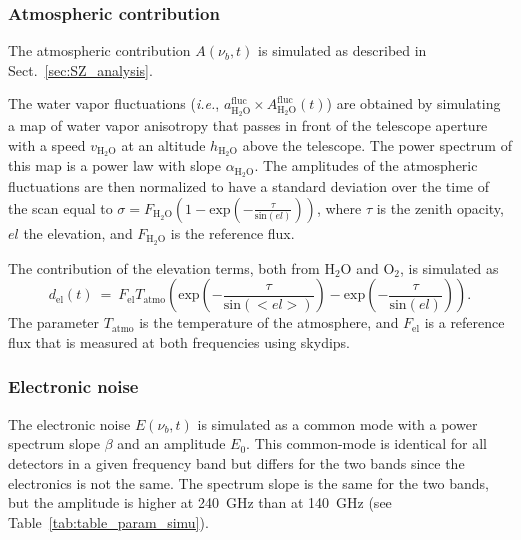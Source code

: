  \subsubsection{Atmospheric contribution}
 \label{sec:atmo_simu}
 The atmospheric contribution $A(\nu_b, t)$ is simulated as described in Sect.~\ref{sec:SZ_analysis}.

The water vapor fluctuations ({\it i.e.}, $a_{\mathrm{H}_2\mathrm{O}} ^{\mathrm{fluc}} \times A_{\mathrm{H}_2\mathrm{O}}^{\mathrm{fluc}} (t)$) are obtained by simulating a map of water vapor anisotropy that passes in front of the telescope aperture with a speed $v_{\mathrm{H}_2\mathrm{O}}$ at an altitude $h_{\mathrm{H}_2\mathrm{O}}$ above the telescope. The power spectrum of this map is a power law with slope $\alpha_{\mathrm{H}_2\mathrm{O}}$. The amplitudes of the atmospheric fluctuations are then normalized to have a standard deviation over the time of the scan equal to $\sigma = F_{\mathrm{H}_2\mathrm{O}} \left(1-\mathrm{exp} \left(-\frac{\tau}{\mathrm{sin} (el)}\right) \right)$, where $\tau$ is the zenith opacity, $el$ the elevation, and $F_{\mathrm{H}_2\mathrm{O}}$ is the reference flux. 

The contribution of the elevation terms, both from $\mathrm{H}_2\mathrm{O}$ and $\mathrm{O}_2$, is simulated as 
   \begin{equation}
	  d_{\mathrm{el}}(t)~=~F_{\mathrm{el}} T_{\mathrm{atmo}} \left(\mathrm{exp}\left(-\frac{\tau}{\mathrm{sin}(<el>)}\right) - \mathrm{exp}\left(-\frac{\tau}{\mathrm{sin}(el)}\right)\right).
	\label{eq:el_term}
   \end{equation}
The parameter $T_{\mathrm{atmo}}$ is the temperature of the atmosphere, and $F_{\mathrm{el}}$ is a reference flux that is measured at both frequencies using skydips.

 \subsubsection{Electronic noise}
 \label{sec:elec_simu}
The electronic noise $E(\nu_b, t)$ is simulated as a common mode with a power spectrum slope $\beta$ and an amplitude $E_0$. This common-mode is identical for all detectors in a given frequency band but differs for the two bands since the electronics is not the same. The spectrum slope is the same for the two bands, but the amplitude is higher at 240~GHz than at 140~GHz (see Table~\ref{tab:table_param_simu}).
 
